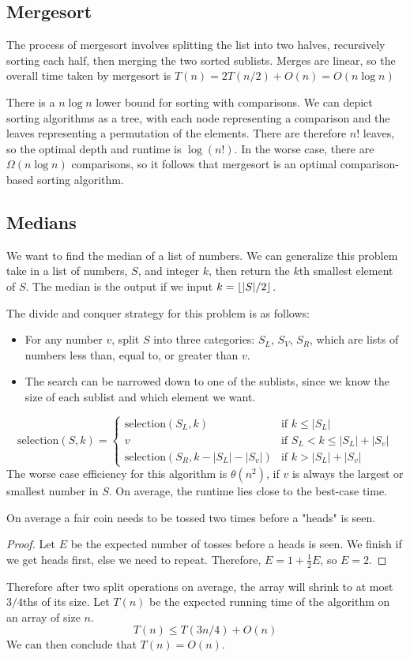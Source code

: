 \subsection{Mergesort}
The process of mergesort involves splitting the list into two halves, recursively sorting each half, then merging the two sorted sublists.
Merges are linear, so the overall time taken by mergesort is $T(n) = 2T(n/2) + O(n) = O(n \log n)$ \par
There is a $n \log n$ lower bound for sorting with comparisons.
We can depict sorting algorithms as a tree, with each node representing a comparison and the leaves representing a permutation of the elements.
There are therefore $n!$ leaves, so the optimal depth and runtime is $\log(n!)$.
In the worse case, there are $\Omega(n \log n)$ comparisons, so it follows that mergesort is an optimal comparison-based sorting algorithm.

\subsection{Medians}
We want to find the median of a list of numbers.
We can generalize this problem take in a list of numbers, $S$, and integer $k$, then return the $k$th smallest element of $S$.
The median is the output if we input $k = \left\lfloor{|S| / 2}\right\rfloor$. \par
The divide and conquer strategy for this problem is as follows:
\begin{itemize}
  \item For any number $v$, split $S$ into three categories: $S_L$, $S_V$, $S_R$, which are lists of numbers less than, equal to, or greater than $v$.
  \item The search can be narrowed down to one of the sublists, since we know the size of each sublist and which element we want.
\end{itemize}
    \[
\text{selection}(S, k) = \begin{cases} \text{selection}(S_L, k) & \text{if $k \leq |S_L|$} \\ v & \text{if $S_L < k \leq |S_L| + |S_v|$} \\ \text{selection}(S_R, k - |S_L| - |S_v|) & \text{if $k > |S_L| + |S_v|$} \end{cases}
    \]
The worse case efficiency for this algorithm is $\theta(n^2)$, if $v$ is always the largest or smallest number in $S$.
On average, the runtime lies close to the best-case time.
\begin{lemma}
  On average a fair coin needs to be tossed two times before a "heads" is seen.
\end{lemma}
\begin{proof}
  Let $E$ be the expected number of tosses before a heads is seen.
  We finish if we get heads first, else we need to repeat.
  Therefore, $E = 1 + \frac{1}{2} E$, so $E = 2$.
\end{proof}
Therefore after two split operations on average, the array will shrink to at most $3/4$ths of its size.
Let $T(n)$ be the expected running time of the algorithm on an array of size $n$.
\[T(n) \leq T(3n/4) + O(n)\]
We can then conclude that $T(n) = O(n)$.

